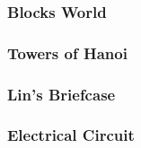 \subsubsection{Blocks World}

\subsubsection{Towers of Hanoi}

\subsubsection{Lin's Briefcase}

\subsubsection{Electrical Circuit}